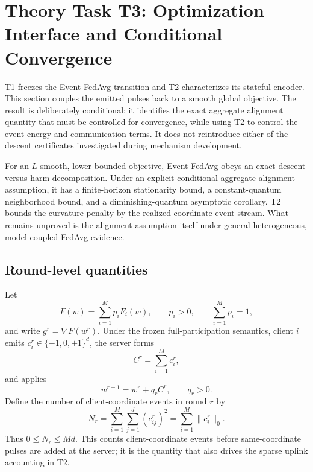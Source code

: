 \section{Theory Task T3: Optimization Interface and Conditional Convergence}
\label{sec:theory-t3-optimization}

T1 freezes the Event-FedAvg transition and T2 characterizes its stateful
encoder.  This section couples the emitted pulses back to a smooth global
objective.  The result is deliberately conditional: it identifies the exact
aggregate alignment quantity that must be controlled for convergence, while
using T2 to control the event-energy and communication terms.  It does not
reintroduce either of the descent certificates investigated during mechanism
development.

\begin{takeawaybox}[title={T3 result boundary}]
For an $L$-smooth, lower-bounded objective, Event-FedAvg obeys an exact
descent-versus-harm decomposition.  Under an explicit conditional aggregate
alignment assumption, it has a finite-horizon stationarity bound, a
constant-quantum neighborhood bound, and a diminishing-quantum asymptotic
corollary.  T2 bounds the curvature penalty by the realized coordinate-event
stream.  What remains unproved is the alignment assumption itself under
general heterogeneous, model-coupled FedAvg evidence.
\end{takeawaybox}

\subsection{Round-level quantities}

Let
\begin{equation}
    F(w)=\sum_{i=1}^{M}p_iF_i(w),
    \qquad p_i>0,
    \qquad \sum_{i=1}^{M}p_i=1,
    \label{eq:t3-global-objective}
\end{equation}
and write $g^r=\nabla F(w^r)$.  Under the frozen full-participation semantics,
client $i$ emits $c_i^r\in\{-1,0,+1\}^d$, the server forms
\begin{equation}
    C^r=\sum_{i=1}^{M}c_i^r,
    \label{eq:t3-aggregate-pulse}
\end{equation}
and applies
\begin{equation}
    w^{r+1}=w^r+q_rC^r,
    \qquad q_r>0.
    \label{eq:t3-server-update}
\end{equation}
Define the number of client-coordinate events in round $r$ by
\begin{equation}
    N_r=\sum_{i=1}^{M}\sum_{j=1}^{d}(c_{ij}^r)^2
       =\sum_{i=1}^{M}\|c_i^r\|_0.
    \label{eq:t3-round-event-count}
\end{equation}
Thus $0\leq N_r\leq Md$.  This counts client-coordinate events before
same-coordinate pulses are added at the server; it is the quantity that also
drives the sparse uplink accounting in T2.

